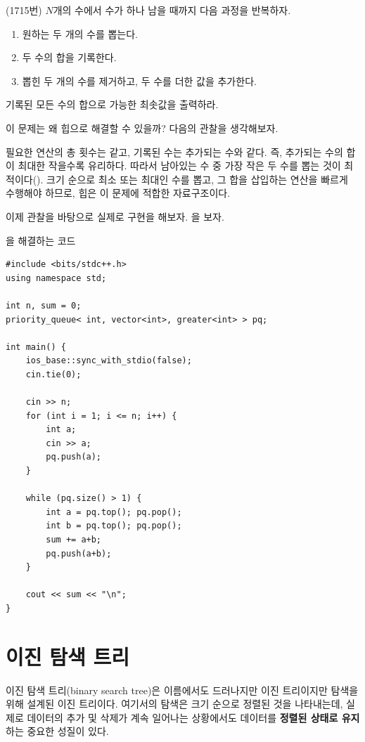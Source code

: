 \begin{example} \label{ex: heap}
    (1715번) $N$개의 수에서 수가 하나 남을 때까지 다음 과정을 반복하자.
    \begin{enumerate}
        \item 원하는 두 개의 수를 뽑는다.
        \item 두 수의 합을 기록한다.
        \item 뽑힌 두 개의 수를 제거하고, 두 수를 더한 값을 추가한다.
    \end{enumerate}
    기록된 모든 수의 합으로 가능한 최솟값을 출력하라.
\end{example}

이 문제는 왜 힙으로 해결할 수 있을까? 다음의 관찰을 생각해보자.

\begin{obs}
    필요한 연산의 총 횟수는 같고, 기록된 수는 추가되는 수와 같다. 즉, 추가되는 수의 합이 최대한 작을수록 유리하다. 따라서 남아있는 수 중 가장 작은 두 수를 뽑는 것이 최적이다(). 크기 순으로 최소 또는 최대인 수를 뽑고, 그 합을 삽입하는 연산을 빠르게 수행해야 하므로, 힙은 이 문제에 적합한 자료구조이다.
\end{obs}

이제 관찰을 바탕으로 실제로 구현을 해보자. 을 보자.

\begin{code} \label{code: add-number}
을 해결하는 코드
\begin{lstlisting}
#include <bits/stdc++.h>
using namespace std;

int n, sum = 0;
priority_queue< int, vector<int>, greater<int> > pq;

int main() {
    ios_base::sync_with_stdio(false);
    cin.tie(0);
    
    cin >> n;
    for (int i = 1; i <= n; i++) {
        int a;
        cin >> a;
        pq.push(a);
    }
    
    while (pq.size() > 1) {
        int a = pq.top(); pq.pop();
        int b = pq.top(); pq.pop();
        sum += a+b;
        pq.push(a+b);
    }
    
    cout << sum << "\n";
}
\end{lstlisting}
\end{code}

\section{이진 탐색 트리}
이진 탐색 트리(binary search tree)은 이름에서도 드러나지만 이진 트리이지만 탐색을 위해 설계된 이진 트리이다. 여기서의 탐색은 크기 순으로 정렬된 것을 나타내는데, 실제로 데이터의 추가 및 삭제가 계속 일어나는 상황에서도 데이터를 \textbf{정렬된 상태로 유지}하는 중요한 성질이 있다.

